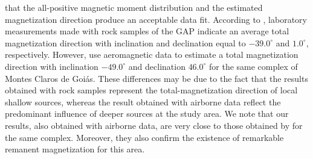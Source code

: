 that the all-positive magnetic moment distribution and the estimated magnetization direction 
produce an acceptable data fit. 
According to \citet{marangoni_mantovani_2013}, laboratory measurements made with 
rock samples of the GAP indicate an average total magnetization direction 
with inclination and declination equal to $-39.0^\circ$ and $1.0^\circ$, 
respectively.
However, \citet{zhang_etal_2018} use aeromagnetic data to estimate a total magnetization direction 
with inclination $-49.0^\circ$ and declination 
$46.0^\circ$ for the same complex of Montes Claros de Goi\'as. 
These differences may be due to the fact that the results obtained with 
rock samples represent the total-magnetization direction of local shallow sources,
whereas the result obtained with airborne data reflect the predominant influence of 
deeper sources at the study area. 
We note that our results, also obtained with airborne data, are very close to 
those obtained by \citet{zhang_etal_2018} for the same complex. Moreover, 
they also confirm the existence of remarkable remanent magnetization for this area. 


